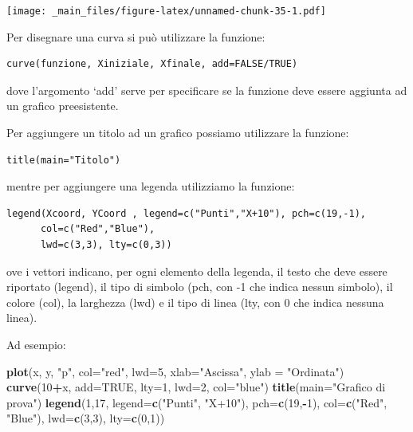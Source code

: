 \documentclass[a4paper,12pt,oneside]{book}
\newenvironment{Shaded}{\begin{snugshade}}{\end{snugshade}}
\newcommand{\KeywordTok}[1]{\textcolor[rgb]{0.13,0.29,0.53}{\textbf{#1}}}
\newcommand{\DataTypeTok}[1]{\textcolor[rgb]{0.13,0.29,0.53}{#1}}
\newcommand{\DecValTok}[1]{\textcolor[rgb]{0.00,0.00,0.81}{#1}}
\newcommand{\StringTok}[1]{\textcolor[rgb]{0.31,0.60,0.02}{#1}}
\newcommand{\OtherTok}[1]{\textcolor[rgb]{0.56,0.35,0.01}{#1}}
\newcommand{\OperatorTok}[1]{\textcolor[rgb]{0.81,0.36,0.00}{\textbf{#1}}}
\newcommand{\NormalTok}[1]{#1}
\begin{document}
\texttt{[image: \_main\_files/figure-latex/unnamed-chunk-35-1.pdf]}

Per disegnare una curva si può utilizzare la funzione:

\begin{verbatim}
curve(funzione, Xiniziale, Xfinale, add=FALSE/TRUE)
\end{verbatim}

dove l'argomento `add' serve per specificare se la funzione deve essere
aggiunta ad un grafico preesistente.

Per aggiungere un titolo ad un grafico possiamo utilizzare la funzione:

\begin{verbatim}
title(main="Titolo")
\end{verbatim}

mentre per aggiungere una legenda utilizziamo la funzione:

\begin{verbatim}
legend(Xcoord, YCoord , legend=c("Punti","X+10"), pch=c(19,-1),
      col=c("Red","Blue"),
      lwd=c(3,3), lty=c(0,3))
\end{verbatim}

ove i vettori indicano, per ogni elemento della legenda, il testo che
deve essere riportato (legend), il tipo di simbolo (pch, con -1 che
indica nessun simbolo), il colore (col), la larghezza (lwd) e il tipo di
linea (lty, con 0 che indica nessuna linea).

Ad esempio:

\begin{Shaded}
\begin{Highlighting}[]
\KeywordTok{plot}\NormalTok{(x, y, }\StringTok{"p"}\NormalTok{, }\DataTypeTok{col=}\StringTok{"red"}\NormalTok{, }\DataTypeTok{lwd=}\DecValTok{5}\NormalTok{, }\DataTypeTok{xlab=}\StringTok{"Ascissa"}\NormalTok{, }
       \DataTypeTok{ylab =} \StringTok{"Ordinata"}\NormalTok{)}
\KeywordTok{curve}\NormalTok{(}\DecValTok{10}\OperatorTok{+}\NormalTok{x, }\DataTypeTok{add=}\OtherTok{TRUE}\NormalTok{, }\DataTypeTok{lty=}\DecValTok{1}\NormalTok{, }\DataTypeTok{lwd=}\DecValTok{2}\NormalTok{, }\DataTypeTok{col=}\StringTok{"blue"}\NormalTok{)}
\KeywordTok{title}\NormalTok{(}\DataTypeTok{main=}\StringTok{"Grafico di prova"}\NormalTok{)}
\KeywordTok{legend}\NormalTok{(}\DecValTok{1}\NormalTok{,}\DecValTok{17}\NormalTok{, }\DataTypeTok{legend=}\KeywordTok{c}\NormalTok{(}\StringTok{"Punti"}\NormalTok{, }\StringTok{"X+10"}\NormalTok{), }\DataTypeTok{pch=}\KeywordTok{c}\NormalTok{(}\DecValTok{19}\NormalTok{,}\OperatorTok{-}\DecValTok{1}\NormalTok{), }
  \DataTypeTok{col=}\KeywordTok{c}\NormalTok{(}\StringTok{"Red"}\NormalTok{, }\StringTok{"Blue"}\NormalTok{), }\DataTypeTok{lwd=}\KeywordTok{c}\NormalTok{(}\DecValTok{3}\NormalTok{,}\DecValTok{3}\NormalTok{), }\DataTypeTok{lty=}\KeywordTok{c}\NormalTok{(}\DecValTok{0}\NormalTok{,}\DecValTok{1}\NormalTok{))}
\end{Highlighting}
\end{Shaded}
\end{document}
